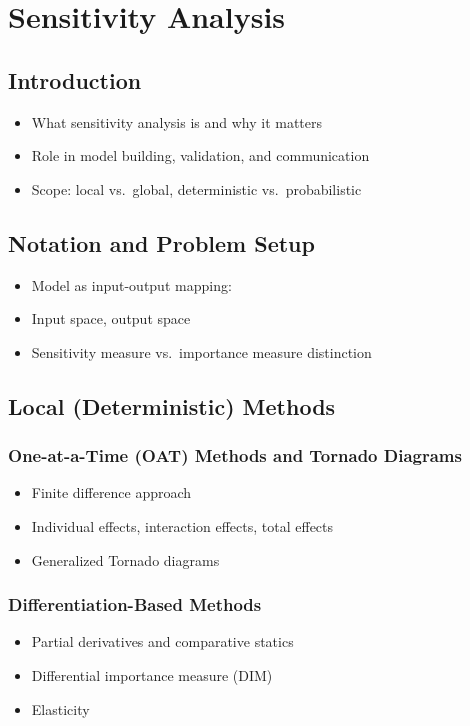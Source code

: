 \documentclass[../proposal]{subfiles}
\begin{document}
\chapter{Sensitivity Analysis}

\section{Introduction}
\begin{itemize}
  \item What sensitivity analysis is and why it matters
  \item Role in model building, validation, and communication
  \item Scope: local vs.\ global, deterministic vs.\ probabilistic
\end{itemize}

\section{Notation and Problem Setup}
\begin{itemize}
  \item Model as input-output mapping: %
  \item Input space, output space
  \item Sensitivity measure vs.\ importance measure distinction
\end{itemize}

\section{Local (Deterministic) Methods}

  \subsection{One-at-a-Time (OAT) Methods and Tornado Diagrams}
  \begin{itemize}
    \item Finite difference approach
    \item Individual effects, interaction effects, total effects
    \item Generalized Tornado diagrams
  \end{itemize}

  \subsection{Differentiation-Based Methods}
  \begin{itemize}
    \item Partial derivatives and comparative statics
    \item Differential importance measure (DIM)
    \item Elasticity
  \end{itemize}
\end{document}
